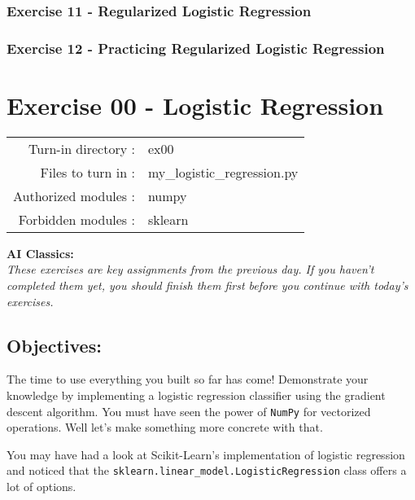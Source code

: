 \documentclass[]{article}
\begin{document}
\hypertarget{exercise-11---regularized-logistic-regression}{%
\subsubsection{Exercise 11 - Regularized Logistic
Regression}\label{exercise-11---regularized-logistic-regression}}

\hypertarget{exercise-12---practicing-regularized-logistic-regression}{%
\subsubsection{Exercise 12 - Practicing Regularized Logistic
Regression}\label{exercise-12---practicing-regularized-logistic-regression}}

\clearpage

\hypertarget{exercise-00---logistic-regression-1}{%
\section{Exercise 00 - Logistic
Regression}\label{exercise-00---logistic-regression-1}}

\begin{longtable}[]{@{}rl@{}}
\toprule
\endhead
Turn-in directory : & ex00\tabularnewline
Files to turn in : & my\_logistic\_regression.py\tabularnewline
Authorized modules : & numpy\tabularnewline
Forbidden modules : & sklearn\tabularnewline
\bottomrule
\end{longtable}

\textbf{AI Classics:}\\
\emph{These exercises are key assignments from the previous day. If you
haven't completed them yet, you should finish them first before you
continue with today's exercises.}

\hypertarget{objectives}{%
\subsection{Objectives:}\label{objectives}}

The time to use everything you built so far has come! Demonstrate your
knowledge by implementing a logistic regression classifier using the
gradient descent algorithm. You must have seen the power of
\texttt{NumPy} for vectorized operations. Well let's make something more
concrete with that.

You may have had a look at Scikit-Learn's implementation of logistic
regression and noticed that the
\texttt{sklearn.linear\_model.LogisticRegression} class offers a lot of
options.
\end{document}

